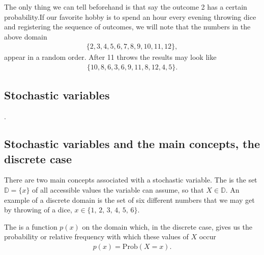 \documentclass[letterpaper,10pt,english]{sphinxmanual}
\begin{document}
The only thing we can tell beforehand
is that say the outcome 2 has a certain probability.If our favorite hobby is to  spend an hour every evening throwing dice and
registering the sequence of outcomes, we will note that the numbers in the above domain
\begin{equation*}
\begin{split}
\{2,3,4,5,6,7,8,9,10,11,12\},
\end{split}
\end{equation*}
appear in a random order. After 11 throws the results may look like
\begin{equation*}
\begin{split}
\{10,8,6,3,6,9,11,8,12,4,5\}.
\end{split}
\end{equation*}

\subsection{Stochastic variables}
\label{\detokenize{chapter2:stochastic-variables}}
.


\subsection{Stochastic variables and the main concepts, the discrete case}
\label{\detokenize{chapter2:stochastic-variables-and-the-main-concepts-the-discrete-case}}
There are two main concepts associated with a stochastic variable. The
 is the set \(\mathbb D = \{x\}\) of all accessible values
the variable can assume, so that \(X \in \mathbb D\). An example of a
discrete domain is the set of six different numbers that we may get by
throwing of a dice, \(x\in\{1,\,2,\,3,\,4,\,5,\,6\}\).

The  is a function
\(p(x)\) on the domain which, in the discrete case, gives us the
probability or relative frequency with which these values of \(X\)
occur
\begin{equation*}
\begin{split}
p(x) = \mathrm{Prob}(X=x).
\end{split}
\end{equation*}
\end{document}
